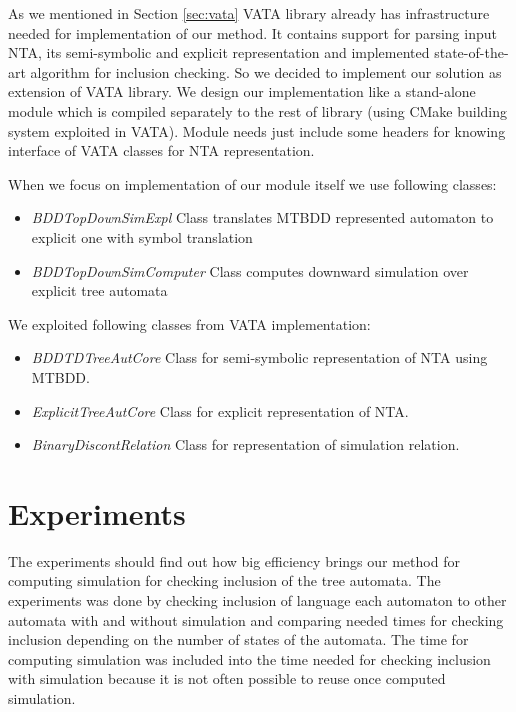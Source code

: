 \documentclass[a4paper, 12pt]{article}
\begin{document}
As we mentioned in Section \ref{sec:vata} VATA library already has infrastructure needed for implementation of
our method.
It contains support for parsing input NTA, its semi-symbolic and explicit representation and implemented
state-of-the-art algorithm for inclusion checking.
So we decided to implement our solution as extension of VATA library.
We design our implementation like a stand-alone module which is compiled separately to the rest of library (using CMake building system exploited in VATA).
Module needs just include some headers for knowing interface of VATA classes for NTA representation.

When we focus on implementation of our module itself we use following classes:
\begin{itemize}
	\item \emph{BDDTopDownSimExpl} Class translates MTBDD represented automaton to explicit one with symbol translation
	\item \emph{BDDTopDownSimComputer} Class computes downward simulation over explicit tree automata
\end{itemize}

We exploited following classes from VATA implementation:

\begin{itemize}
	\item \emph{BDDTDTreeAutCore} Class for semi-symbolic representation of NTA using MTBDD.
	\item \emph{ExplicitTreeAutCore} Class for explicit representation of NTA.
	\item \emph{BinaryDiscontRelation} Class for representation of simulation relation.
\end{itemize}

\section{Experiments}
\label{sec:exps}

The experiments should find out how big efficiency brings our method for computing simulation for checking inclusion of the tree automata.
The experiments was done by checking inclusion of language each automaton to other automata with and without simulation
and comparing needed times for checking inclusion depending on the number of states of the automata.
The time for computing simulation was included into the time needed for checking inclusion with simulation
because it is not often possible to reuse once computed simulation.
\end{document}
